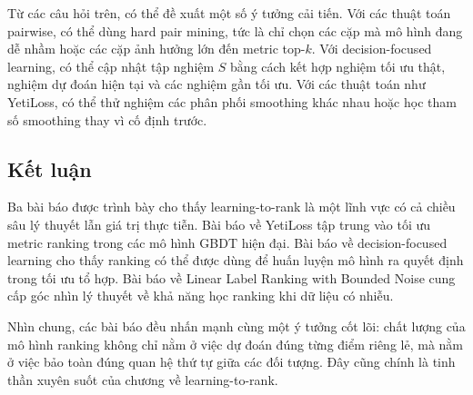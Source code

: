 Từ các câu hỏi trên, có thể đề xuất một số ý tưởng cải tiến. Với các thuật toán pairwise, có thể dùng hard pair mining, tức là chỉ chọn các cặp mà mô hình đang dễ nhầm hoặc các cặp ảnh hưởng lớn đến metric top-\(k\). Với decision-focused learning, có thể cập nhật tập nghiệm \(S\) bằng cách kết hợp nghiệm tối ưu thật, nghiệm dự đoán hiện tại và các nghiệm gần tối ưu. Với các thuật toán như YetiLoss, có thể thử nghiệm các phân phối smoothing khác nhau hoặc học tham số smoothing thay vì cố định trước.

\subsection{Kết luận}

Ba bài báo được trình bày cho thấy learning-to-rank là một lĩnh vực có cả chiều sâu lý thuyết lẫn giá trị thực tiễn. Bài báo về YetiLoss tập trung vào tối ưu metric ranking trong các mô hình GBDT hiện đại. Bài báo về decision-focused learning cho thấy ranking có thể được dùng để huấn luyện mô hình ra quyết định trong tối ưu tổ hợp. Bài báo về Linear Label Ranking with Bounded Noise cung cấp góc nhìn lý thuyết về khả năng học ranking khi dữ liệu có nhiễu.

Nhìn chung, các bài báo đều nhấn mạnh cùng một ý tưởng cốt lõi: chất lượng của mô hình ranking không chỉ nằm ở việc dự đoán đúng từng điểm riêng lẻ, mà nằm ở việc bảo toàn đúng quan hệ thứ tự giữa các đối tượng. Đây cũng chính là tinh thần xuyên suốt của chương về learning-to-rank.